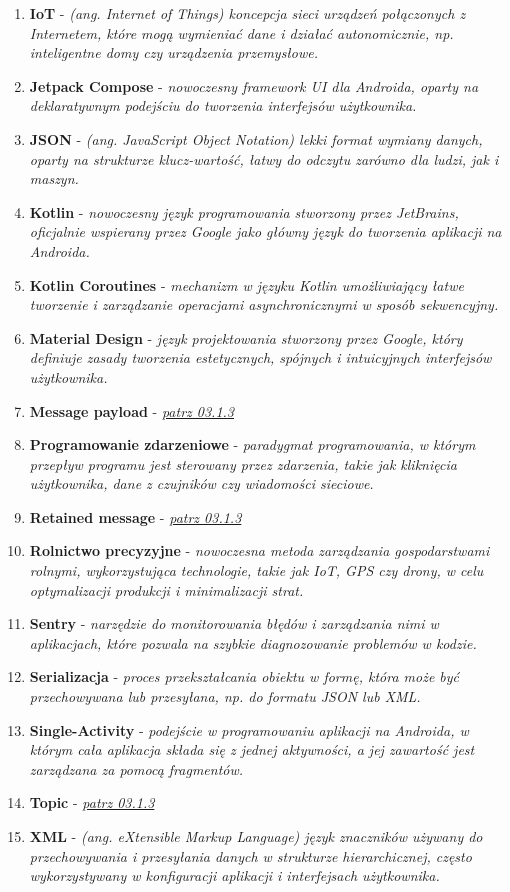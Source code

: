 \begin{enumerate}[leftmargin=*]
\item \textbf{IoT} - \textit{(ang. Internet of Things) koncepcja sieci urządzeń połączonych z Internetem, które mogą wymieniać dane i działać autonomicznie, np. inteligentne domy czy urządzenia przemysłowe.}
\item \textbf{Jetpack Compose} - \textit{nowoczesny framework UI dla Androida, oparty na deklaratywnym podejściu do tworzenia interfejsów użytkownika.}
\item \textbf{JSON} - \textit{(ang. JavaScript Object Notation) lekki format wymiany danych, oparty na strukturze klucz-wartość, łatwy do odczytu zarówno dla ludzi, jak i maszyn.}
\item \textbf{Kotlin} - \textit{nowoczesny język programowania stworzony przez JetBrains, oficjalnie wspierany przez Google jako główny język do tworzenia aplikacji na Androida.}
\item \textbf{Kotlin Coroutines} - \textit{mechanizm w języku Kotlin umożliwiający łatwe tworzenie i zarządzanie operacjami asynchronicznymi w sposób sekwencyjny.}
\item \textbf{Material Design} - \textit{język projektowania stworzony przez Google, który definiuje zasady tworzenia estetycznych, spójnych i intuicyjnych interfejsów użytkownika.}
\item \textbf{Message payload} - \textit{\hyperlink{message payload}{patrz 03.1.3}}
\item \textbf{Programowanie zdarzeniowe} - \textit{paradygmat programowania, w którym przepływ programu jest sterowany przez zdarzenia, takie jak kliknięcia użytkownika, dane z czujników czy wiadomości sieciowe.}
\item \textbf{Retained message} - \textit{\hyperlink{retained message}{patrz 03.1.3}}
\item \textbf{Rolnictwo precyzyjne} - \textit{nowoczesna metoda zarządzania gospodarstwami rolnymi, wykorzystująca technologie, takie jak IoT, GPS czy drony, w celu optymalizacji produkcji i minimalizacji strat.}
\item \textbf{Sentry} - \textit{narzędzie do monitorowania błędów i zarządzania nimi w aplikacjach, które pozwala na szybkie diagnozowanie problemów w kodzie.}
\item \textbf{Serializacja} - \textit{proces przekształcania obiektu w formę, która może być przechowywana lub przesyłana, np. do formatu JSON lub XML.}
\item \textbf{Single-Activity} - \textit{podejście w programowaniu aplikacji na Androida, w którym cała aplikacja składa się z jednej aktywności, a jej zawartość jest zarządzana za pomocą fragmentów.}
\item \textbf{Topic} - \textit{\hyperlink{topic}{patrz 03.1.3}}
\item \textbf{XML} - \textit{(ang. eXtensible Markup Language) język znaczników używany do przechowywania i przesyłania danych w strukturze hierarchicznej, często wykorzystywany w konfiguracji aplikacji i interfejsach użytkownika.}
\end{enumerate}